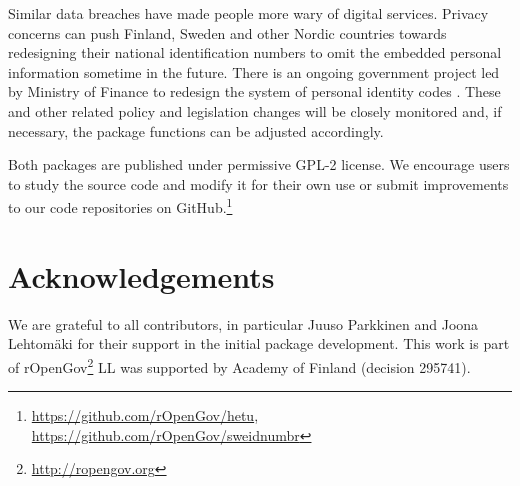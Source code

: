 Similar data breaches have made people more wary of digital services. Privacy concerns can push Finland, Sweden and other Nordic countries towards redesigning their national identification numbers to omit the embedded personal information sometime in the future. There is an ongoing government project led by Ministry of Finance to redesign the system of personal identity codes \citep{hetuvm}. These and other related policy and legislation changes will be closely monitored and, if necessary, the package functions can be adjusted accordingly.

Both packages are published under permissive GPL-2 license. We encourage users to study the source code and modify it for their own use or submit improvements to our code repositories on GitHub.\footnote{\url{https://github.com/rOpenGov/hetu}, \url{https://github.com/rOpenGov/sweidnumbr}}

\section{Acknowledgements}

We are grateful to all contributors, in particular Juuso Parkkinen and Joona Lehtomäki for their support in the initial package development. This work is part of rOpenGov\footnote{\url{http://ropengov.org}} LL was supported by Academy of Finland (decision 295741).



\address{Pyry Kantanen\\
  Department of Computing\\
  PO Box 20014 University of Turku\\
  Finland\\
  ORCiD: 0000-0003-2853-2765\\
  }
  
\address{Måns Magnusson\\
  Department of Statistics\\
  Uppsala University\\
  Sweden\\
  ORCiD: 0000-0002-0296-2719\\
  }

\address{Leo Lahti\\
  Department of Computing\\
  PO Box 20014 University of Turku\\
  Finland\\
  ORCiD: 0000-0001-5537-637X\\
  }
